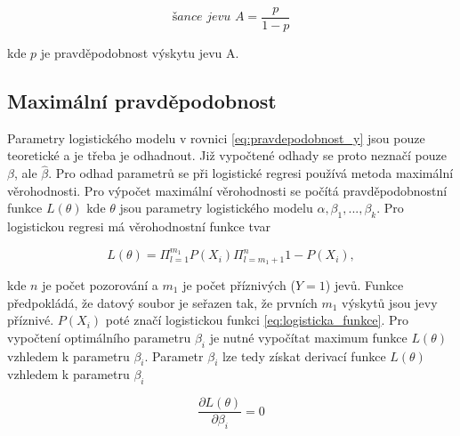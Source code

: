 \begin{equation}
    \label{eq:logitova_funkce}
    \textit{šance jevu A} = \frac{p}{1 - p}
\end{equation}

kde $p$ je pravděpodobnost výskytu jevu A.

\subsection{Maximální pravděpodobnost}
Parametry logistického modelu v rovnici \ref{eq:pravdepodobnost_y} jsou pouze teoretické a je třeba je odhadnout. Již vypočtené odhady
se proto neznačí pouze $\beta$, ale $\hat{\beta}$. Pro odhad parametrů se při logistické regresi používá metoda maximální věrohodnosti. Pro výpočet
maximální věrohodnosti se počítá pravděpodobnostní funkce $L(\theta)$ kde $\theta$ jsou parametry logistického modelu $\alpha, \beta_1, ..., \beta_k$.
Pro logistickou regresi má věrohodnostní funkce tvar

\begin{equation}
    \label{eq:pravdepodobnostni_fce}
    L(\theta) = \Pi_{l = 1}^{m_1} P(X_i) \Pi_{l = m_1 + 1}^{n} 1 - P(X_i),
\end{equation}

kde $n$ je počet pozorování a $m_1$ je počet příznivých ($Y = 1$) jevů. Funkce předpokládá, že datový soubor je seřazen tak, že prvních $m_1$ výskytů
jsou jevy příznivé. $P(X_i)$ poté značí logistickou funkci \ref{eq:logisticka_funkce}. Pro vypočtení optimálního parametru $\beta_i$ je nutné vypočítat
maximum funkce $L(\theta)$ vzhledem k parametru $\beta_i$. Parametr $\beta_i$ lze tedy získat derivací funkce $L(\theta)$ vzhledem k parametru $\beta_i$

\begin{equation}
    \frac{\partial L(\theta)}{\partial \beta_i} = 0
\end{equation}

